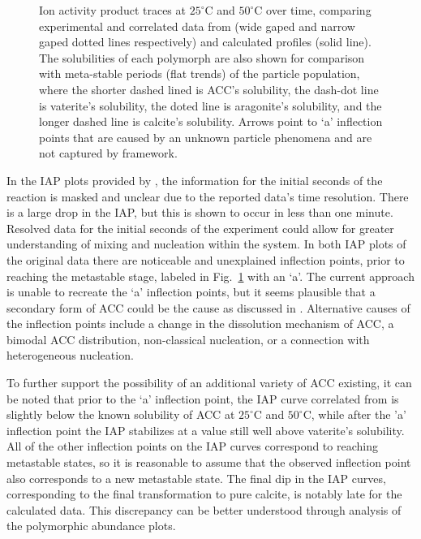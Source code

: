 \documentclass[preprint,3p,a4paper,times,12pt,authoryear]{elsarticle}
\begin{document}
\begin{figure}[h!tb]
\begin{center}
\end{center}
\caption{Ion activity product traces at $25^\circ$C and $50^\circ$C over time, comparing experimental and correlated data from \citep{Ogino1987} (wide gaped and narrow gaped dotted lines respectively) and calculated profiles (solid line).  The solubilities of each polymorph are also shown for comparison with meta-stable periods (flat trends) of the particle population, where the shorter dashed lined is ACC's solubility, the dash-dot line is vaterite's solubility, the doted line is aragonite's solubility, and the longer dashed line is calcite's solubility.  Arrows point to `a' inflection points that are caused by an unknown particle phenomena and are not captured by framework.} 
\label{IAP}
\end{figure}

In the IAP plots provided by \citeauthor{Ogino1987}, the information for the initial seconds of the reaction is masked and unclear due to the reported data's time resolution.  There is a large drop in the IAP, but this is shown to occur in less than one minute.  Resolved data for the initial seconds of the experiment could allow for greater understanding of mixing and nucleation within the system.  In both IAP plots of the original data there are noticeable and unexplained inflection points, prior to reaching the metastable stage, labeled in Fig.~\ref{IAP} with an `a'.  The current approach is unable to recreate the `a' inflection points, but it seems plausible that a secondary form of ACC could be the cause as discussed in \citep{Cartwright2012,Radha2010} .  Alternative causes of the inflection points include a change in the dissolution mechanism of ACC, a bimodal ACC distribution, non-classical nucleation, or a connection with heterogeneous nucleation.  

To further support the possibility of an additional variety of ACC existing, it can be noted that prior to the `a' inflection point, the IAP curve correlated from \citeauthor{Ogino1987} is slightly below the known solubility of ACC at $25^\circ$C and $50^\circ$C, while after the 'a' inflection point the IAP stabilizes at a value still well above vaterite's solubility.  All of the other inflection points on the IAP curves correspond to reaching metastable states, so it is reasonable to assume that the observed inflection point also corresponds to a new metastable state.   The final dip in the IAP curves, corresponding to the final transformation to pure calcite, is notably late for the calculated data.  This discrepancy can be better understood through analysis of the polymorphic abundance plots.
\end{document}
